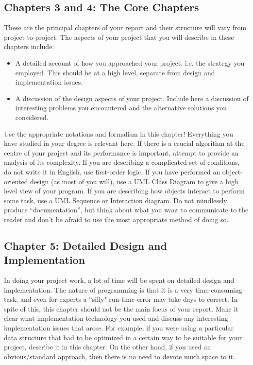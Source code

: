 \documentclass[]{final_report}
\begin{document}
\subsection{Chapters 3 and 4: The Core Chapters}

These are the principal chapters of your report and their structure will vary from project to project. The aspects of your project that you will describe in these chapters include:

\begin{itemize}
\item A detailed account of how you approached your project, i.e. the strategy you employed. This should be at a high level, separate from design and implementation issues.
\item A discussion of the design aspects of your project. Include here a discussion of interesting problems you encountered and the alternative solutions you considered.
\end{itemize}

Use the appropriate notations and formalism in this chapter! Everything you have studied in your degree is relevant here. If there is a crucial algorithm at the centre of your project and its performance is important, attempt to provide an analysis of its complexity. If you are describing a complicated set of conditions, do not write it in English, use first-order logic. If you have performed an object-oriented design (as most of you will), use a UML Class Diagram to give a high level view of your program. If you are describing how objects interact to perform some task, use a UML Sequence or Interaction diagram. Do not mindlessly produce ``documentation'', but think about what you want to communicate to the reader and don't be afraid to use the most appropriate method of doing so.

\subsection{Chapter 5: Detailed Design and Implementation}

In doing your project work, a lot of time will be spent on detailed design and implementation. The nature of programming is that it is a very time-consuming task, and even for experts a ``silly" run-time error may take days to correct. In spite of this, this chapter should not be the main focus of your report. Make it clear what implementation technology you used and discuss any interesting implementation issues that arose. For example, if you were using a particular data structure that had to be optimized in a certain way to be suitable for your project, describe it in this chapter. On the other hand, if you used an obvious/standard approach, then there is no need to devote much space to it.
\end{document}
